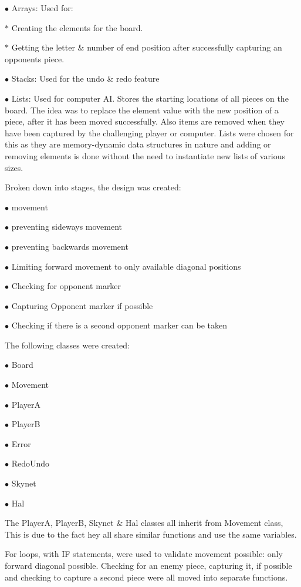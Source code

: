 \documentclass[10pt, a4paper]{article}
\begin{document}
    $\bullet$ Arrays: Used for: 
    
    $\ast$ Creating the elements for the board.
    	 
    $\ast$ Getting the letter \& number of end position after successfully capturing an opponents piece.
    
    $\bullet$ Stacks: 
    Used for the undo \& redo feature
    
    $\bullet$ Lists:
    Used for computer AI.  Stores the starting locations of all pieces on the board. The idea was to replace the element value with the new position of a piece, after it has been moved successfully. Also items are removed when they have been captured by the challenging player or computer. Lists were chosen for this as they are memory-dynamic data structures in nature and adding or removing elements is done without the need to instantiate new lists of various sizes.
    
    Broken down into stages, the design was created:
    
    $\bullet$ movement
    
    $\bullet$ preventing sideways movement 
       
    $\bullet$ preventing backwards movement
     
    $\bullet$ Limiting forward movement to only available diagonal positions
    
    $\bullet$ Checking for opponent marker
    
    $\bullet$ Capturing Opponent marker if possible
    
    $\bullet$ Checking if there is a second opponent marker can be taken
    
    The following classes were created:
    
    $\bullet$ Board
    
    $\bullet$ Movement
    
    $\bullet$ PlayerA
    
    $\bullet$ PlayerB
    
    $\bullet$ Error
    
    $\bullet$ RedoUndo
    
    $\bullet$ Skynet
    
    $\bullet$ Hal
    
    The PlayerA, PlayerB, Skynet \& Hal classes all inherit from Movement class, This is due to the fact hey all share similar functions and use the same variables.
    
    For loops, with IF statements, were used to validate movement possible: only forward diagonal possible. Checking for an enemy piece, capturing it, if possible and checking to capture a second piece were all moved into separate functions.
    
\end{document}
